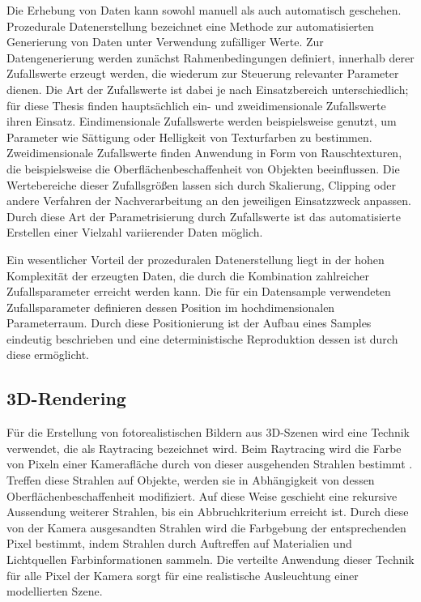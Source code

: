 Die Erhebung von Daten kann sowohl manuell als auch automatisch geschehen. Prozedurale Datenerstellung bezeichnet eine Methode zur automatisierten Generierung von Daten unter Verwendung zufälliger Werte. Zur Datengenerierung werden zunächst Rahmenbedingungen definiert, innerhalb derer Zufallswerte erzeugt werden, die wiederum zur Steuerung relevanter Parameter dienen. Die Art der Zufallswerte ist dabei je nach Einsatzbereich unterschiedlich; für diese Thesis finden hauptsächlich ein- und zweidimensionale Zufallswerte ihren Einsatz. Eindimensionale Zufallswerte werden beispielsweise genutzt, um Parameter wie Sättigung oder Helligkeit von Texturfarben zu bestimmen. Zweidimensionale Zufallswerte finden Anwendung in Form von Rauschtexturen, die beispielsweise die Oberflächenbeschaffenheit von Objekten beeinflussen. Die Wertebereiche dieser Zufallsgrößen lassen sich durch Skalierung, Clipping oder andere Verfahren der Nachverarbeitung an den jeweiligen Einsatzzweck anpassen. Durch diese Art der Parametrisierung durch Zufallswerte ist das automatisierte Erstellen einer Vielzahl variierender Daten möglich.

Ein wesentlicher Vorteil der prozeduralen Datenerstellung liegt in der hohen Komplexität der erzeugten Daten, die durch die Kombination zahlreicher Zufallsparameter erreicht werden kann. Die für ein Datensample verwendeten Zufallsparameter definieren dessen Position im hochdimensionalen Parameterraum. Durch diese Positionierung ist der Aufbau eines Samples eindeutig beschrieben und eine deterministische Reproduktion dessen ist durch diese ermöglicht.


\subsection{3D-Rendering}
\label{sec:3d_rendering}

Für die Erstellung von fotorealistischen Bildern aus 3D-Szenen wird eine Technik verwendet, die als Raytracing bezeichnet wird. Beim Raytracing wird die Farbe von Pixeln einer Kamerafläche durch von dieser ausgehenden Strahlen bestimmt \cite{ray_tracing,ray_tracing_distributed,ray_tracing_equations}. Treffen diese Strahlen auf Objekte, werden sie in Abhängigkeit von dessen Oberflächenbeschaffenheit modifiziert. Auf diese Weise geschieht eine rekursive Aussendung weiterer Strahlen, bis ein Abbruchkriterium erreicht ist. Durch diese von der Kamera ausgesandten Strahlen wird die Farbgebung der entsprechenden Pixel bestimmt, indem Strahlen durch Auftreffen auf Materialien und Lichtquellen Farbinformationen sammeln. Die verteilte Anwendung dieser Technik für alle Pixel der Kamera sorgt für eine realistische Ausleuchtung einer modellierten Szene.

